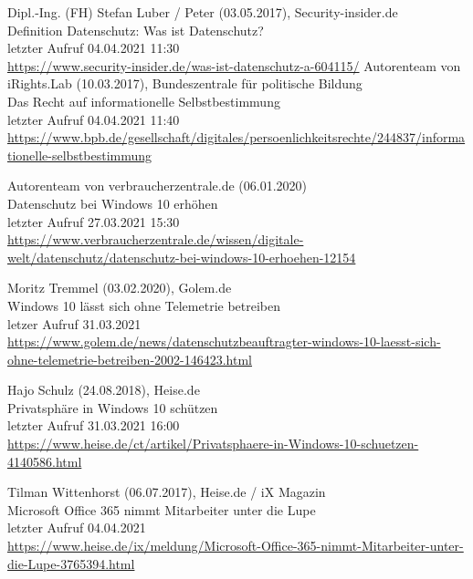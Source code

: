 \begin{thebibliography}{9}
    \bibitem{}
        Dipl.-Ing. (FH) Stefan Luber / Peter (03.05.2017), Security-insider.de
        \\Definition Datenschutz: Was ist Datenschutz?
        \\letzter Aufruf 04.04.2021 11:30
        \\\url{https://www.security-insider.de/was-ist-datenschutz-a-604115/}
    \pagebreak
    \bibitem{}
        Autorenteam von iRights.Lab (10.03.2017), Bundeszentrale für politische Bildung
        \\Das Recht auf informationelle Selbstbestimmung
        \\letzter Aufruf 04.04.2021 11:40
        \\\url{https://www.bpb.de/gesellschaft/digitales/persoenlichkeitsrechte/244837/informationelle-selbstbestimmung}

    \bibitem{}
        Autorenteam von verbraucherzentrale.de (06.01.2020)
        \\Datenschutz bei Windows 10 erhöhen
        \\letzter Aufruf 27.03.2021 15:30
        \\\url{https://www.verbraucherzentrale.de/wissen/digitale-welt/datenschutz/datenschutz-bei-windows-10-erhoehen-12154}

    \bibitem{}
        Moritz Tremmel (03.02.2020), Golem.de
        \\Windows 10 lässt sich ohne Telemetrie betreiben
        \\letzer Aufruf 31.03.2021
        \\\url{https://www.golem.de/news/datenschutzbeauftragter-windows-10-laesst-sich-ohne-telemetrie-betreiben-2002-146423.html}

    \bibitem{}
        Hajo Schulz (24.08.2018), Heise.de
        \\Privatsphäre in Windows 10 schützen
        \\letzter Aufruf 31.03.2021 16:00
        \\\url{https://www.heise.de/ct/artikel/Privatsphaere-in-Windows-10-schuetzen-4140586.html}

    \bibitem{}
        Tilman Wittenhorst (06.07.2017), Heise.de / iX Magazin
        \\Microsoft Office 365 nimmt Mitarbeiter unter die Lupe
        \\letzter Aufruf 04.04.2021
        \\\url{https://www.heise.de/ix/meldung/Microsoft-Office-365-nimmt-Mitarbeiter-unter-die-Lupe-3765394.html}


\end{thebibliography}
